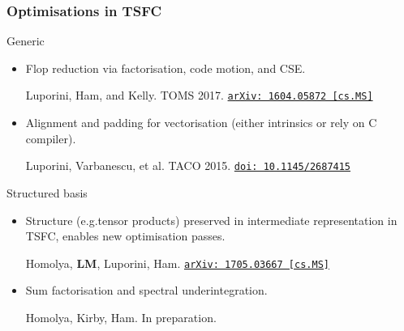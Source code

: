 \documentclass[presentation]{beamer}
\newcommand{\arxivlink}[2]{%
  \href{http://www.arxiv.org/abs/#1}%
  {\texttt{arXiv:\,#1\,[#2]}}%
}
\newcommand{\doilink}[1]{%
  \href{http://dx.doi.org/#1}%
  {\texttt{doi:\,#1}}%
}
\begin{document}
\begin{frame}
  \frametitle{Optimisations in TSFC}
  \begin{block}{Generic}
    \begin{itemize}
    \item Flop reduction via factorisation, code motion, and CSE.
      \begin{flushright}
        {\scriptsize
        Luporini, Ham, and Kelly.  TOMS
        2017. \arxivlink{1604.05872}{cs.MS}\nocite{Luporini:2017}}
      \end{flushright}
    \item Alignment and padding for vectorisation (either intrinsics
      or rely on C compiler).
      \begin{flushright}
        {\scriptsize
        Luporini, Varbanescu, et al. TACO
        2015. \doilink{10.1145/2687415}\nocite{Luporini:2015}}
      \end{flushright}
    \end{itemize}
  \end{block}
  \begin{block}{Structured basis}
    \begin{itemize}
    \item Structure (e.g.\@ tensor products) preserved in intermediate
      representation in TSFC, enables new optimisation passes.
      \begin{flushright}
        {\scriptsize Homolya, \textbf{LM}, Luporini, Ham. \arxivlink{1705.03667}{cs.MS}\nocite{Homolya:2017}}
      \end{flushright}
    \item Sum factorisation and spectral underintegration.
      \begin{flushright}
        {\scriptsize Homolya, Kirby, Ham. In preparation.}
      \end{flushright}
    \end{itemize}
  \end{block}
\end{frame}
\end{document}

